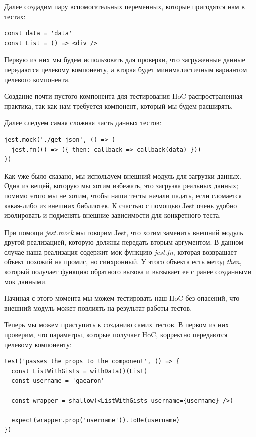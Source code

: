 Далее создадим пару вспомогательных переменных, которые пригодятся нам в тестах:

\begin{lstlisting}
const data = 'data'
const List = () => <div />
\end{lstlisting}

Первую из них мы будем использовать для проверки, что загруженные данные передаются целевому компоненту, а вторая будет минималистичным вариантом целевого компонента.

Создание почти пустого компонента для тестирования HoC распространенная практика, так как нам требуется компонент, который мы будем расширять. 

Далее следуем самая сложная часть данных тестов:

\begin{lstlisting}
jest.mock('./get-json', () => (
  jest.fn(() => ({ then: callback => callback(data) }))
))
\end{lstlisting}

Как уже было сказано, мы используем внешний модуль для загрузки данных. Одна из вещей, которую мы хотим избежать, это загрузка реальных данных; помимо этого мы не хотим, чтобы наши тесты начали падать, если сломается какая-либо из внешних библиотек. К счастью с помощью Jest очень удобно изолировать и подменять внешние зависимости для конкретного теста.

При помощи \textit{jest.mock} мы говорим Jest, что хотим заменить внешний модуль другой реализацией, которую должны передать вторым аргументом. В данном случае наша реализация содержит мок функцию \textit{jest.fn}, которая возвращает объект похожий на промис, но синхронный. У этого объекта есть метод \textit{then}, который получает функцию обратного вызова и вызывает ее с ранее созданными мок данными.

Начиная с этого момента мы можем тестировать наш HoC без опасений, что внешний модуль может повлиять на результат работы тестов.

Теперь мы можем приступить к созданию самих тестов. В первом из них проверим, что параметры, которые получает HoC, корректно передаются целевому компоненту:

\begin{lstlisting}
test('passes the props to the component', () => {
  const ListWithGists = withData()(List)
  const username = 'gaearon'
  
  const wrapper = shallow(<ListWithGists username={username} />)
  
  expect(wrapper.prop('username')).toBe(username)
})
\end{lstlisting}

